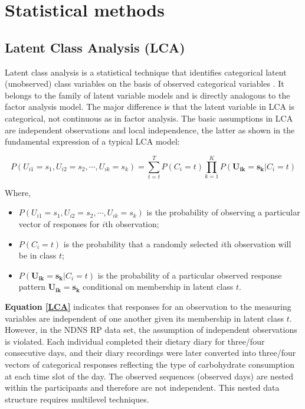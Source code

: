 \section[Statistical methods]{Statistical methods}

\subsection{Latent Class Analysis (LCA)}\vspace{-0.3cm}

Latent class analysis is a statistical technique that identifies categorical latent (unobserved) class variables on the basis of observed categorical variables \parencite{collins2010latent}. It belongs to the family of latent variable models and is directly analogous to the factor analysis model. The major difference is that the latent variable in LCA is categorical, not continuous as in factor analysis. The basic assumptions in LCA are independent observations and local independence, the latter as shown in the fundamental expression of a typical LCA model: \vspace{-0.8cm}

\begin{equation}
P(U_{i1} = s_1, U_{i2} = s_2, \cdots, U_{ik} = s_k) = \sum_{t=t}^{T}P(C_i = t)\prod_{k = 1}^{K}P(\mathbf{U_{ik}} = \mathbf{s_k} | C_i = t)
\label{LCA}
\end{equation}\vspace{-0.7cm}

Where, 

\begin{itemize}
	\item $P(U_{i1} = s_1, U_{i2} = s_2, \cdots, U_{ik} = s_k)$ is the probability of observing a particular vector of responses for $i$th observation;
	\item $P(C_i = t)$ is the probability that a randomly selected $i$th observation will be in class $t$;
	\item $P(\mathbf{U_{ik}} = \mathbf{s_k} | C_i = t)$ is the probability of a particular observed response pattern $\mathbf{U_{ik}} = \mathbf{s_k}$ conditional on membership in latent class $t$.
\end{itemize}


\textbf{Equation \ref{LCA}} indicates that responses for an observation to the measuring variables are independent of one another given its membership in latent class $t$. However, in the NDNS RP data set, the assumption of independent observations is violated. Each individual completed their dietary diary for three/four consecutive days, and their diary recordings were later converted into three/four vectors of categorical responses reflecting the type of carbohydrate consumption at each time slot of the day. The observed sequences (observed days) are nested within the participants and therefore are not independent. This nested data structure requires multilevel techniques. 
\vspace{-0.3cm}

